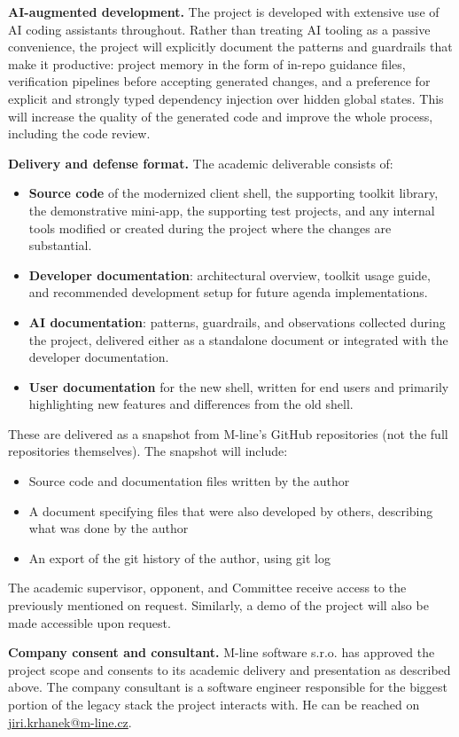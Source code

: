 \documentclass{article}
\begin{document}
\medskip
\noindent \textbf{AI-augmented development.} The project is developed with extensive use of AI coding assistants throughout. Rather than treating AI tooling as a passive convenience, the project will explicitly document the patterns and guardrails that make it productive: project memory in the form of in-repo guidance files, verification pipelines before accepting generated changes, and a preference for explicit and strongly typed dependency injection over hidden global states. This will increase the quality of the generated code and improve the whole process, including the code review.

\medskip
\noindent \textbf{Delivery and defense format.} The academic deliverable consists of:
\begin{itemize}
  \item \textbf{Source code} of the modernized client shell, the supporting toolkit library, the demonstrative mini-app, the supporting test projects, and any internal tools modified or created during the project where the changes are substantial.
  \item \textbf{Developer documentation}: architectural overview, toolkit usage guide, and recommended development setup for future agenda implementations.
  \item \textbf{AI documentation}: patterns, guardrails, and observations collected during the project, delivered either as a standalone document or integrated with the developer documentation.
  \item \textbf{User documentation} for the new shell, written for end users and primarily highlighting new features and differences from the old shell.
\end{itemize}

These are delivered as a snapshot from M-line's GitHub repositories (not the full repositories themselves). The snapshot will include:
\begin{itemize}
  \item Source code and documentation files written by the author
  \item A document specifying files that were also developed by others, describing what was done by the author
  \item An export of the git history of the author, using git log
\end{itemize}
The academic supervisor, opponent, and Committee receive access to the previously mentioned on request. Similarly, a demo of the project will also be made accessible upon request.

\medskip
\noindent \textbf{Company consent and consultant.} M-line software s.r.o. has approved the project scope and consents to its academic delivery and presentation as described above. The company consultant is a software engineer responsible for the biggest portion of the legacy stack the project interacts with. He can be reached on \href{mailto:jiri.krhanek@m-line.cz}{jiri.krhanek@m-line.cz}.
\end{document}

